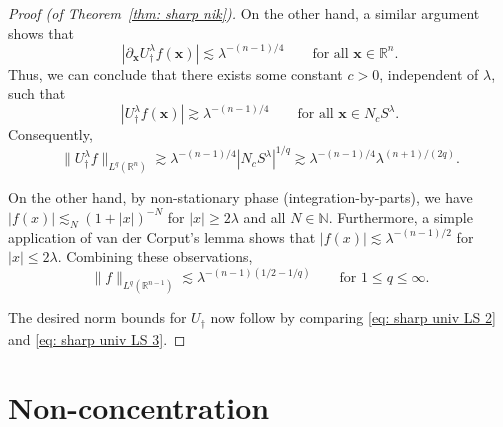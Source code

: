 \documentclass[reqno]{amsart}
\numberwithin{equation}{section}
\newcommand{\N}{\mathbb{N}}
\newcommand{\R}{\mathbb{R}}
\newcommand{\bx}{\mathbf{x}}
\theoremstyle{plain}
\theoremstyle{definition}
\begin{document}
\begin{proof}[Proof (of Theorem~\ref{thm: sharp nik})]
On the other hand, a similar argument shows that
\begin{equation*}
    |\partial_{\bx} U_{\dagger}^{\lambda}f(\bx)| \lesssim \lambda^{-(n-1)/4} \qquad \textrm{for all $\bx \in \R^n$.}
\end{equation*}
Thus, we can conclude that there exists some constant $c > 0$, independent of $\lambda$, such that
\begin{equation*}
    |U_{\dagger}^{\lambda}f(\bx)| \gtrsim \lambda^{-(n-1)/4} \qquad \textrm{for all $\bx \in N_c S^{\lambda}$.}
\end{equation*}
Consequently,
\begin{equation}\label{eq: sharp univ LS 2}
    \|U_{\dagger}^{\lambda}f\|_{L^q(\R^n)} \gtrsim \lambda^{-(n-1)/4} | N_c S^{\lambda}|^{1/q} \gtrsim \lambda^{-(n-1)/4} \lambda^{(n+1)/(2q)}. 
\end{equation}

On the other hand, by non-stationary phase (integration-by-parts), we have $|f(x)| \lesssim_N (1 + |x|)^{-N}$ for $|x| \geq 2\lambda$ and all $N \in \N$. Furthermore, a simple application of van der Corput's lemma shows that $|f(x)| \lesssim \lambda^{-(n-1)/2}$ for $|x| \leq 2 \lambda$. Combining these observations,
\begin{equation}\label{eq: sharp univ LS 3}
    \|f\|_{L^q(\R^{n-1})} \lesssim \lambda^{-(n-1)(1/2 - 1/q)} \qquad \textrm{for $1 \leq q \leq \infty$.}
\end{equation}

The desired norm bounds for $U_{\dagger}$ now follow by comparing \eqref{eq: sharp univ LS 2} and \eqref{eq: sharp univ LS 3}.
\end{proof}




\section{Non-concentration}\label{sec: non-concentration}



\end{document}
